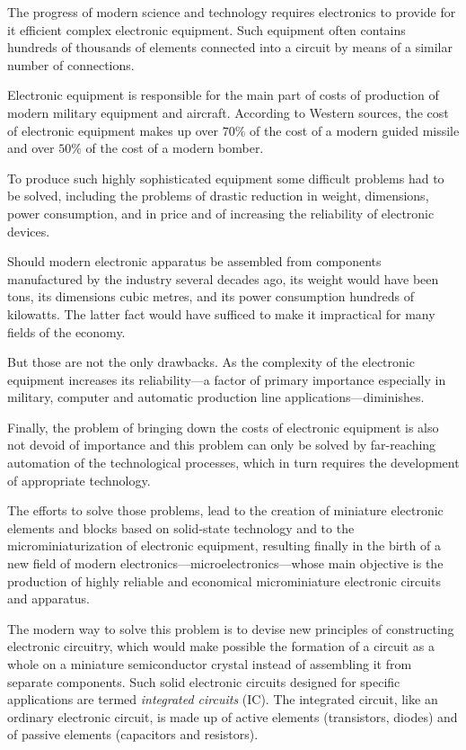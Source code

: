 The progress of modern science and technology requires electronics to provide for it efficient complex electronic equipment. Such equipment often contains hundreds of thousands of elements connected
into a circuit by means of a similar number of connections.

Electronic equipment is responsible for the main part of costs of production of modern military equipment and aircraft. According to Western sources, the cost of electronic equipment makes up over $70\%$ of the cost of a modern guided missile and over $50\%$ of the cost of a modern bomber.

To produce such highly sophisticated equipment some difficult problems had to be solved, including the problems of drastic reduction in weight, dimensions, power consumption, and in price and of increasing the reliability of electronic devices.

Should modern electronic apparatus be assembled from components manufactured by the industry several decades ago, its weight would have been tons, its dimensions cubic metres, and its power consumption hundreds of kilowatts. The latter fact would have sufficed to make it impractical for many fields of the economy.

But those are not the only drawbacks. As the complexity of the electronic equipment increases its reliability---a factor of primary importance especially in military, computer and automatic production line applications---diminishes.

Finally, the problem of bringing down the costs of electronic equipment is also not devoid of importance and this problem can only be solved by far-reaching automation of the technological processes, which in turn requires the development of appropriate technology.

The efforts to solve those problems, lead to the creation of miniature electronic elements and blocks based on solid-state technology and to the microminiaturization of electronic equipment, resulting finally in the birth of a new field of modern electronics---microelectronics---whose main objective is the production of highly reliable and economical microminiature electronic circuits and apparatus.

The modern way to solve this problem is to devise new principles of constructing electronic circuitry, which would make possible the formation of a circuit as a whole on a miniature semiconductor crystal instead of assembling it from separate components. Such solid electronic circuits designed for specific applications are termed \textit{integrated circuits} (IC). The integrated circuit, like an ordinary electronic circuit, is made up of active elements (transistors, diodes) and of passive elements (capacitors and resistors).

